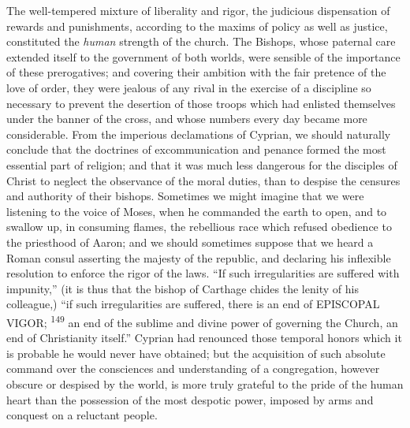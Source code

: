 



The well-tempered mixture of liberality and rigor, the judicious
dispensation of rewards and punishments, according to the maxims
of policy as well as justice, constituted the \textit{human} strength of
the church. The Bishops, whose paternal care extended itself to
the government of both worlds, were sensible of the importance of
these prerogatives; and covering their ambition with the fair
pretence of the love of order, they were jealous of any rival in
the exercise of a discipline so necessary to prevent the
desertion of those troops which had enlisted themselves under the
banner of the cross, and whose numbers every day became more
considerable. From the imperious declamations of Cyprian, we
should naturally conclude that the doctrines of excommunication
and penance formed the most essential part of religion; and that
it was much less dangerous for the disciples of Christ to neglect
the observance of the moral duties, than to despise the censures
and authority of their bishops. Sometimes we might imagine that
we were listening to the voice of Moses, when he commanded the
earth to open, and to swallow up, in consuming flames, the
rebellious race which refused obedience to the priesthood of
Aaron; and we should sometimes suppose that we heard a Roman
consul asserting the majesty of the republic, and declaring his
inflexible resolution to enforce the rigor of the laws. “If such
irregularities are suffered with impunity,” (it is thus that the
bishop of Carthage chides the lenity of his colleague,) “if such
irregularities are suffered, there is an end of EPISCOPAL VIGOR; \textsuperscript{149}
an end of the sublime and divine power of governing the
Church, an end of Christianity itself.” Cyprian had renounced
those temporal honors which it is probable he would never have
obtained; but the acquisition of such absolute command over the
consciences and understanding of a congregation, however obscure
or despised by the world, is more truly grateful to the pride of
the human heart than the possession of the most despotic power,
imposed by arms and conquest on a reluctant people.

